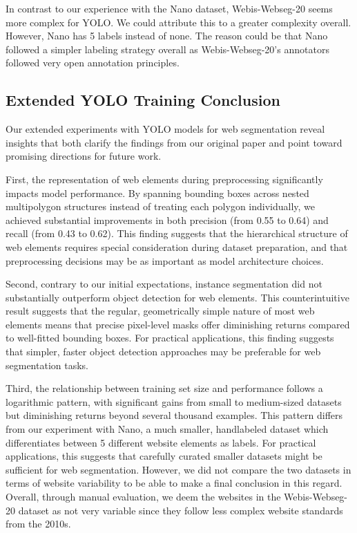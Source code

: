 \documentclass{article}  %
\begin{document}
In contrast to our experience with the Nano dataset, Webis-Webseg-20 seems more complex for YOLO. We could attribute this to a greater complexity overall. However, Nano has 5 labels instead of none. The reason could be that Nano followed a simpler labeling strategy overall as Webis-Webseg-20's annotators followed very open annotation principles.

\subsection{Extended YOLO Training Conclusion}

Our extended experiments with YOLO models for web segmentation reveal insights that both clarify the findings from our original paper and point toward promising directions for future work.

First, the representation of web elements during preprocessing significantly impacts model performance. By spanning bounding boxes across nested multipolygon structures instead of treating each polygon individually, we achieved substantial improvements in both precision (from 0.55 to 0.64) and recall (from 0.43 to 0.62). This finding suggests that the hierarchical structure of web elements requires special consideration during dataset preparation, and that preprocessing decisions may be as important as model architecture choices.

Second, contrary to our initial expectations, instance segmentation did not substantially outperform object detection for web elements. This counterintuitive result suggests that the regular, geometrically simple nature of most web elements means that precise pixel-level masks offer diminishing returns compared to well-fitted bounding boxes. For practical applications, this finding suggests that simpler, faster object detection approaches may be preferable for web segmentation tasks.

Third, the relationship between training set size and performance follows a logarithmic pattern, with significant gains from small to medium-sized datasets but diminishing returns beyond several thousand examples. This pattern differs from our experiment with Nano, a much smaller, handlabeled dataset which differentiates between 5 different website elements as labels. For practical applications, this suggests that carefully curated smaller datasets might be sufficient for web segmentation. However, we did not compare the two datasets in terms of website variability to be able to make a final conclusion in this regard. Overall, through manual evaluation, we deem the websites in the Webis-Webseg-20 dataset as not very variable since they follow less complex website standards from the 2010s. 
 
\end{document}
